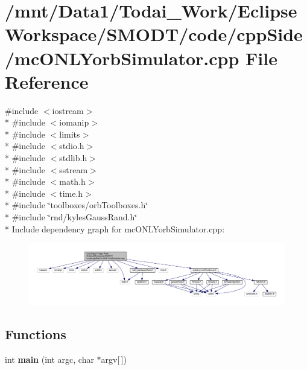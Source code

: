 \section{/mnt/\-Data1/\-Todai\-\_\-\-Work/\-Eclipse\-Workspace/\-S\-M\-O\-D\-T/code/cpp\-Side/mc\-O\-N\-L\-Yorb\-Simulator.cpp File Reference}
\label{mc_o_n_l_yorb_simulator_8cpp}
{\ttfamily \#include $<$iostream$>$}\\*
{\ttfamily \#include $<$iomanip$>$}\\*
{\ttfamily \#include $<$limits$>$}\\*
{\ttfamily \#include $<$stdio.\-h$>$}\\*
{\ttfamily \#include $<$stdlib.\-h$>$}\\*
{\ttfamily \#include $<$sstream$>$}\\*
{\ttfamily \#include $<$math.\-h$>$}\\*
{\ttfamily \#include $<$time.\-h$>$}\\*
{\ttfamily \#include \char`\"{}toolboxes/orb\-Toolboxes.\-h\char`\"{}}\\*
{\ttfamily \#include \char`\"{}rnd/kyles\-Gauss\-Rand.\-h\char`\"{}}\\*
Include dependency graph for mc\-O\-N\-L\-Yorb\-Simulator.\-cpp\-:
\nopagebreak
\begin{figure}[H]
\begin{center}
\leavevmode
\includegraphics[width=350pt]{mc_o_n_l_yorb_simulator_8cpp__incl}
\end{center}
\end{figure}
\subsection*{Functions}
\begin{DoxyCompactItemize}
\item 
int {\bf main} (int argc, char $\ast$argv[$\,$])
\end{DoxyCompactItemize}


